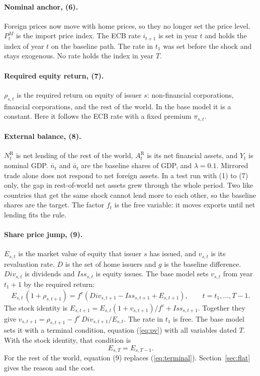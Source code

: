 \documentclass[11pt,a4paper]{article}
\newcommand{\row}{\mathrm{R}}
\begin{document}
\paragraph{Nominal anchor, (6).}
Foreign prices now move with home prices, so they no longer set the price level.
$P^{M}_t$ is the import price index. The ECB rate $i_{t+1}$ is set in year $t$ and holds the index of year $t$ on the baseline path.
The rate in $t_1$ was set before the shock and stays exogenous.
No rate holds the index in year $T$.

\paragraph{Required equity return, (7).}
$\rho_{s,t}$ is the required return on equity of issuer $s$: non-financial corporations, financial corporations, and the rest of the world.
In the base model it is a constant. Here it follows the ECB rate with a fixed premium $\pi_{s,t}$.

\paragraph{External balance, (8).}
$N^{\row}_t$ is net lending of the rest of the world, $A^{\row}_t$ is its net financial assets, and $Y_t$ is nominal GDP.
$\bar{n}_t$ and $\bar{a}_t$ are the baseline shares of GDP, and $\lambda = 0.1$.
Mirrored trade alone does not respond to net foreign assets.
In a test run with (1) to (7) only, the gap in rest-of-world net assets grew through the whole period.
Two like countries that get the same shock cannot lend more to each other, so the baseline shares are the target.
The factor $f_t$ is the free variable: it moves exports until net lending fits the rule.

\paragraph{Share price jump, (9).}
$E_{s,t}$ is the market value of equity that issuer $s$ has issued, and $v_{s,t}$ is its revaluation rate.
$D$ is the set of home issuers and $g$ is the baseline difference.
$\mathit{Div}_{s,t}$ is dividends and $\mathit{Iss}_{s,t}$ is equity issues.
The base model sets $v_{s,t}$ from year $t_1+1$ by the required return:
\begin{equation}
E_{s,t}\,(1+\rho_{s,t+1}) = f^v \left( \mathit{Div}_{s,t+1} - \mathit{Iss}_{s,t+1} + E_{s,t+1} \right), \qquad t = t_1,\dots,T-1 .
\label{eq:pv}
\end{equation}
The stock identity is $E_{s,t+1} = E_{s,t}(1+v_{s,t+1})/f^v + \mathit{Iss}_{s,t+1}$.
Together they give $v_{s,t+1} = \rho_{s,t+1} - f^v\,\mathit{Div}_{s,t+1}/E_{s,t}$.
The rate in $t_1$ is free. The base model sets it with a terminal condition, equation (\ref{eq:pv}) with all variables dated $T$.
With the stock identity, that condition is
\begin{equation}
E_{s,T} = E_{s,T-1} .
\label{eq:terminal}
\end{equation}
For the rest of the world, equation (9) replaces (\ref{eq:terminal}). Section~\ref{sec:flat} gives the reason and the cost.
\end{document}
